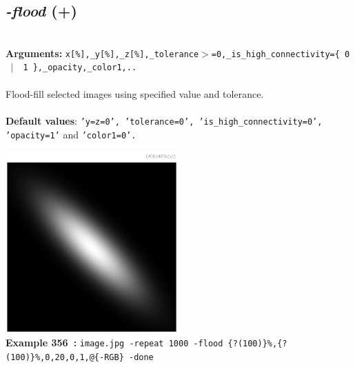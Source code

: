 \documentclass[a4paper,11pt,twoside]{book}
\begin{document}
\subsection{\emph{-flood} (+)}\vspace*{-0.5em}
~\\\textbf{Arguments: } 
{\small \texttt{x[\%],\_y[\%],\_z[\%],\_tolerance$>$=0,\_is\_high\_connectivity=\{ 0 ~$|$~ 1 \},\_opacity,\_color1,..}}\\~\\
Flood-fill selected images using specified value and tolerance.
~\\~\\\textbf{Default values}: {\small \texttt{'y=z=0', 'tolerance=0', 'is\_high\_connectivity=0', 'opacity=1'} and \texttt{'color1=0'.}}
\begin{center}\includegraphics[keepaspectratio=true,height=7cm,width=\textwidth]{img/gmic_def356.jpg}\\
{\footnotesize \textbf{Example 356~:} \texttt{image.jpg -repeat 1000 -flood \{?(100)\}\%,\{?(100)\}\%,0,20,0,1,@\{-RGB\} -done}}
\end{center}
\end{document}
